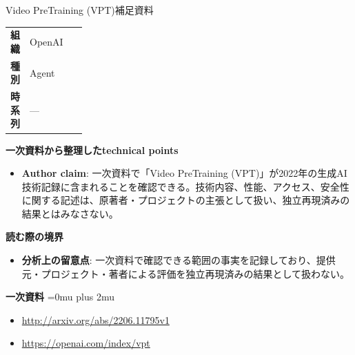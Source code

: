 \begin{technicalnote}{Video PreTraining (VPT)}{補足資料}
\begingroup
\begin{tabularx}{\linewidth}{@{}>{\bfseries}p{0.22\linewidth}X@{}}
組織 & OpenAI \\
種別 & Agent \\
時系列 & — \\
\end{tabularx}
\smallskip
{\bfseries 一次資料から整理したtechnical points}
\begin{itemize}[leftmargin=1.5em,itemsep=0.35em]
\item \textbf{Author claim}: 一次資料で「Video PreTraining (VPT)」が2022年の生成AI技術記録に含まれることを確認できる。技術内容、性能、アクセス、安全性に関する記述は、原著者・プロジェクトの主張として扱い、独立再現済みの結果とはみなさない。
\end{itemize}
\begin{minipage}{\linewidth}
{\bfseries 読む際の境界}
\begin{itemize}[leftmargin=1.5em,itemsep=0.35em]
\item \textbf{分析上の留意点}: 一次資料で確認できる範囲の事実を記録しており、提供元・プロジェクト・著者による評価を独立再現済みの結果として扱わない。
\end{itemize}
\begin{samepage}
{\bfseries 一次資料}
\begingroup\sloppy
\Urlmuskip=0mu plus 2mu\relax
\begin{itemize}[leftmargin=1.5em,itemsep=0.25em]
\item {\scriptsize\url{http://arxiv.org/abs/2206.11795v1}}
\item {\scriptsize\url{https://openai.com/index/vpt}}
\end{itemize}
\endgroup
\end{samepage}
\end{minipage}
\endgroup
\end{technicalnote}
\medskip

